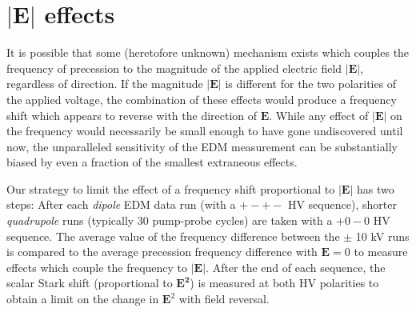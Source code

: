 \documentclass [10pt, twoside] {uwthesis}[2012/04/02]
\begin{document}
\section{$|\mathbf{E}|$ effects} \label{|E|_effects}
It is possible that some (heretofore unknown) mechanism exists which couples the frequency of precession to the magnitude of the applied electric field $|\mathbf{E}|$, regardless of direction. If the magnitude $|\mathbf{E}|$ is different for the two polarities of the applied voltage, the combination of these effects would produce a frequency shift which appears to reverse with the direction of $\mathbf{E}$. While any effect of $|\mathbf{E}|$ on the frequency would necessarily be small enough to have gone undiscovered until now, the unparalleled sensitivity of the EDM measurement can be substantially biased by even a fraction of the smallest extraneous effects. 

Our strategy to limit the effect of a frequency shift proportional to $|\mathbf{E}|$ has two steps: After each \textit{dipole} EDM data run (with a $+-+-$ HV sequence), shorter \textit{quadrupole} runs (typically 30 pump-probe cycles) are taken with a $+0-0$ HV sequence. The average value of the frequency difference between the $\pm$ 10 kV runs is compared to the average precession frequency difference with $\mathbf{E}=0$ to measure effects which couple the frequency to $|\mathbf{E}|$. After the end of each sequence, the scalar Stark shift (proportional to $\mathbf{E^2}$) is measured at both HV polarities to obtain a limit on the change in $\mathbf{E}^2$ with field reversal.
\end{document}
